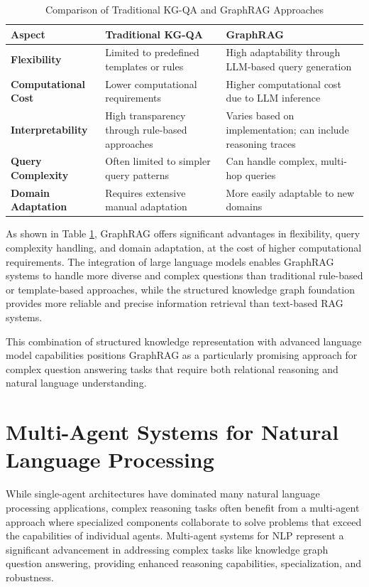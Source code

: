 \begin{table}
    \centering
    \caption{Comparison of Traditional KG-QA and GraphRAG Approaches}
    \label{tab:kg-qa-comparison}
    \begin{tabular}{|p{3cm}|p{5cm}|p{5cm}|}
        \hline
         \textbf{Aspect} & \textbf{Traditional KG-QA} & \textbf{GraphRAG} \\
        \hline
         \textbf{Flexibility} & Limited to predefined templates or rules & High adaptability through LLM-based query generation \\
        \hline
         \textbf{Computational Cost} & Lower computational requirements & Higher computational cost due to LLM inference \\
        \hline
         \textbf{Interpretability} & High transparency through rule-based approaches & Varies based on implementation; can include reasoning traces \\
        \hline
         \textbf{Query Complexity} & Often limited to simpler query patterns & Can handle complex, multi-hop queries \\
        \hline
         \textbf{Domain Adaptation} & Requires extensive manual adaptation & More easily adaptable to new domains \\
        \hline
    \end{tabular}
\end{table}

As shown in Table \ref{tab:kg-qa-comparison}, GraphRAG offers significant advantages in flexibility, query complexity handling, and domain adaptation, at the cost of higher computational requirements. The integration of large language models enables GraphRAG systems to handle more diverse and complex questions than traditional rule-based or template-based approaches, while the structured knowledge graph foundation provides more reliable and precise information retrieval than text-based RAG systems.

This combination of structured knowledge representation with advanced language model capabilities positions GraphRAG as a particularly promising approach for complex question answering tasks that require both relational reasoning and natural language understanding.

\section{Multi-Agent Systems for Natural Language Processing}
\label{sec:multi-agent}
While single-agent architectures have dominated many natural language processing applications, complex reasoning tasks often benefit from a multi-agent approach where specialized components collaborate to solve problems that exceed the capabilities of individual agents. Multi-agent systems for NLP represent a significant advancement in addressing complex tasks like knowledge graph question answering, providing enhanced reasoning capabilities, specialization, and robustness.

